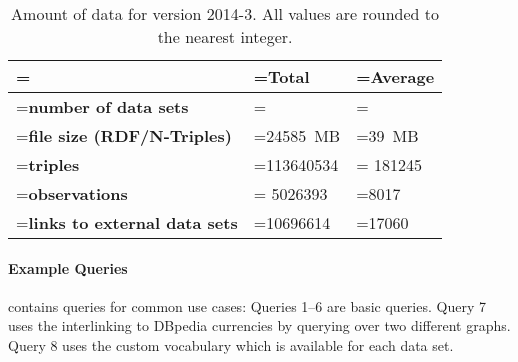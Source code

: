 \documentclass[sw]{iosart2x}
\begin{document}
\begin{table}[hbtp]
\caption{Amount of data for version 2014-3. All values are rounded to the nearest integer.}
\label{tab:amountofdata}
\tiny
\renewcommand{\tabcolsep}{5pt}
\begin{tabularx}{\columnwidth}{
   >{\hsize=\hsize}L 
   >{\hsize=\hsize}L 
   >{\hsize=\hsize}L 
}
\toprule	
	&\textbf{Total}    		&\textbf{Average}\\ 
\midrule
\textbf{number of data sets}    		&\numberofdatasets{}\\
\textbf{file size (RDF/N-Triples)}	&\SI{24585}{MB}		&\SI{39}{MB}\\
\textbf{triples}     		    &\num{113640534}&	\num{181245}\\
\textbf{observations} 			& \num{5026393}		&\num{8017}\\
\textbf{links to external data sets} 			&\num{10696614}		&\num{17060}\\
\bottomrule
\end{tabularx}
\end{table}
\paragraph{Example Queries} 
 contains queries for common use cases:
Queries 1--6 are basic queries.
Query 7 uses the interlinking to DBpedia currencies by querying over two different graphs.\footnotemark{}
Query 8 uses the custom vocabulary\footnotemark{} which is available for each data set.
\end{document}
